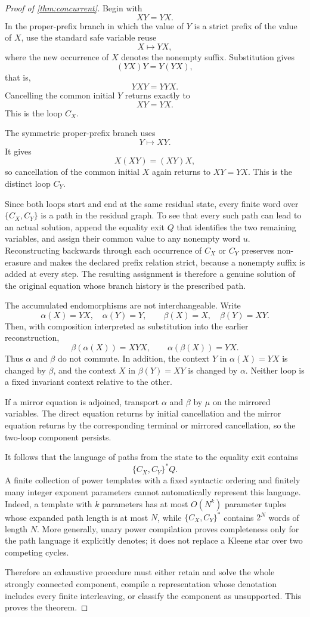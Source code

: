 \documentclass[11pt]{article}
\begin{document}
\begin{proof}[Proof of \cref{thm:concurrent}]
Begin with
\[
  XY=YX.
\]
In the proper-prefix branch in which the value of $Y$ is a strict prefix of the value of $X$, use the standard safe variable reuse
\[
  X\mapsto YX,
\]
where the new occurrence of $X$ denotes the nonempty suffix. Substitution gives
\[
  (YX)Y=Y(YX),
\]
that is,
\[
  YXY=YYX.
\]
Cancelling the common initial $Y$ returns exactly to
\[
  XY=YX.
\]
This is the loop $C_X$.

The symmetric proper-prefix branch uses
\[
  Y\mapsto XY.
\]
It gives
\[
  X(XY)=(XY)X,
\]
so cancellation of the common initial $X$ again returns to $XY=YX$. This is the distinct loop $C_Y$.

Since both loops start and end at the same residual state, every finite word over $\{C_X,C_Y\}$ is a path in the residual graph. To see that every such path can lead to an actual solution, append the equality exit $Q$ that identifies the two remaining variables, and assign their common value to any nonempty word $u$. Reconstructing backwards through each occurrence of $C_X$ or $C_Y$ preserves non-erasure and makes the declared prefix relation strict, because a nonempty suffix is added at every step. The resulting assignment is therefore a genuine solution of the original equation whose branch history is the prescribed path.

The accumulated endomorphisms are not interchangeable. Write
\[
  \alpha(X)=YX,\quad \alpha(Y)=Y,
  \qquad
  \beta(X)=X,\quad \beta(Y)=XY.
\]
Then, with composition interpreted as substitution into the earlier reconstruction,
\[
  \beta(\alpha(X))=XYX,
  \qquad
  \alpha(\beta(X))=YX.
\]
Thus $\alpha$ and $\beta$ do not commute. In addition, the context $Y$ in $\alpha(X)=YX$ is changed by $\beta$, and the context $X$ in $\beta(Y)=XY$ is changed by $\alpha$. Neither loop is a fixed invariant context relative to the other.

If a mirror equation is adjoined, transport $\alpha$ and $\beta$ by $\mu$ on the mirrored variables. The direct equation returns by initial cancellation and the mirror equation returns by the corresponding terminal or mirrored cancellation, so the two-loop component persists.

It follows that the language of paths from the state to the equality exit contains
\[
  \{C_X,C_Y\}^*Q.
\]
A finite collection of power templates with a fixed syntactic ordering and finitely many integer exponent parameters cannot automatically represent this language. Indeed, a template with $k$ parameters has at most $O(N^k)$ parameter tuples whose expanded path length is at most $N$, while $\{C_X,C_Y\}^*$ contains $2^N$ words of length $N$. More generally, unary power compilation proves completeness only for the path language it explicitly denotes; it does not replace a Kleene star over two competing cycles.

Therefore an exhaustive procedure must either retain and solve the whole strongly connected component, compile a representation whose denotation includes every finite interleaving, or classify the component as unsupported. This proves the theorem.
\end{proof}
\end{document}

